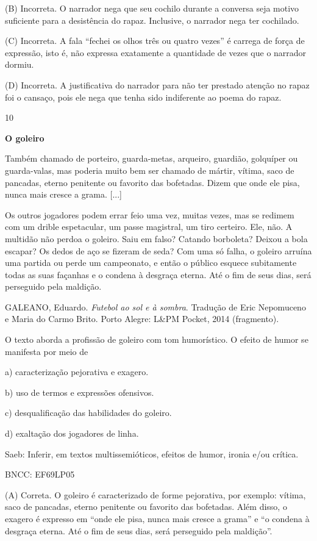 (B) Incorreta. O narrador nega que seu cochilo durante a conversa seja
motivo suficiente para a desistência do rapaz. Inclusive, o narrador
nega ter cochilado.

(C) Incorreta. A fala ``fechei os olhos três ou quatro vezes'' é carrega
de força de expressão, isto é, não expressa exatamente a quantidade de
vezes que o narrador dormiu.

(D) Incorreta. A justificativa do narrador para não ter prestado atenção
no rapaz foi o cansaço, pois ele nega que tenha sido indiferente ao
poema do rapaz.

\num{10}

\textbf{O goleiro}

Também chamado de porteiro, guarda-metas, arqueiro, guardião, golquíper
ou guarda-valas, mas poderia muito bem ser chamado de mártir, vítima,
saco de pancadas, eterno penitente ou favorito das bofetadas. Dizem que
onde ele pisa, nunca mais cresce a grama. {[}...{]}

Os outros jogadores podem errar feio uma vez, muitas vezes, mas se
redimem com um drible espetacular, um passe magistral, um tiro certeiro.
Ele, não. A multidão não perdoa o goleiro. Saiu em falso? Catando
borboleta? Deixou a bola escapar? Os dedos de aço se fizeram de seda?
Com uma só falha, o goleiro arruína uma partida ou perde um campeonato,
e então o público esquece subitamente todas as suas façanhas e o condena
à desgraça eterna. Até o fim de seus dias, será perseguido pela
maldição.

GALEANO, Eduardo. \emph{Futebol ao sol e à sombra}. Tradução de Eric
Nepomuceno e Maria do Carmo Brito. Porto Alegre: L\&PM Pocket, 2014
(fragmento).

O texto aborda a profissão de goleiro com tom humorístico. O efeito de
humor se manifesta por meio de

a) caracterização pejorativa e exagero.

b) uso de termos e expressões ofensivos.

c) desqualificação das habilidades do goleiro.

d) exaltação dos jogadores de linha.

Saeb: Inferir, em textos multissemióticos, efeitos de humor, ironia e/ou
crítica.

BNCC: EF69LP05

(A) Correta. O goleiro é caracterizado de forme pejorativa, por exemplo:
vítima, saco de pancadas, eterno penitente ou favorito das bofetadas.
Além disso, o exagero é expresso em ``onde ele pisa, nunca mais cresce a
grama'' e ``o condena à desgraça eterna. Até o fim de seus dias, será
perseguido pela maldição''.

